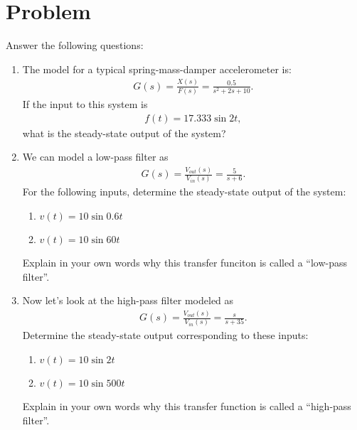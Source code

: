 \documentclass[11pt, reqno]{article}    %
\begin{document}
\section{Problem} Answer the following questions:
\begin{enumerate}
    \item The model for a typical spring-mass-damper accelerometer is:
    \begin{align*}
         G(s) = \frac{X(s)}{F(s)} = \frac{0.5}{s^2 + 2 s + 10} .
    \end{align*}
    If the input to this system is
    \begin{align*}
        f(t) = 17.333 \sin 2 t ,
    \end{align*}
    what is the steady-state output of the system?
    \item We can model a low-pass filter as
    \begin{align*}
        G(s) = \frac{V_{out}(s)}{V_{in}(s)} = \frac{5}{s + 6} .
    \end{align*}
    For the following inputs, determine the steady-state output of the system:
    \begin{enumerate}
        \item \( v(t) = 10 \sin 0.6 t\)
        \item \( v(t) = 10 \sin 60 t\)
    \end{enumerate}
    Explain in your own words why this transfer funciton is called a ``low-pass filter''.
    \item Now let's look at the high-pass filter modeled as
    \begin{align*}
        G(s) = \frac{V_{out}(s)}{V_{in}(s)} = \frac{s}{s + 35} .
    \end{align*}
    Determine the steady-state output corresponding to these inputs:
    \begin{enumerate}
        \item \( v(t) = 10 \sin 2 t\)
        \item \( v(t) = 10 \sin 500 t\)
    \end{enumerate}
    Explain in your own words why this transfer function is called a ``high-pass filter''.
\end{enumerate}
\end{document}
